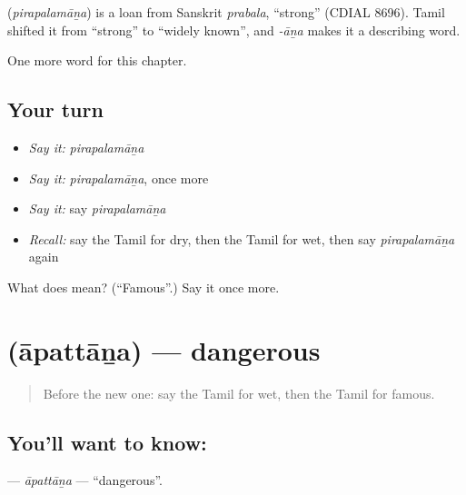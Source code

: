 \begin{cousinweb}
\textbf{} (\emph{pirapalamāṉa}) is a loan from Sanskrit \emph{prabala}, \textquotedblleft{}strong\textquotedblright{} (CDIAL 8696). Tamil shifted it from \textquotedblleft{}strong\textquotedblright{} to \textquotedblleft{}widely known\textquotedblright{}, and \emph{-āṉa} makes it a describing word.
\end{cousinweb}

\begin{grammarlens}[title={What you've built}]
One more word for this chapter.
\end{grammarlens}

\subsection*{Your turn}
\begin{itemize}
\raggedright
  \item \emph{Say it:} \emph{pirapalamāṉa}
  \item \emph{Say it:} \emph{pirapalamāṉa}, once more
  \item \emph{Say it:} say \emph{pirapalamāṉa}
  \item \emph{Recall:} say the Tamil for dry, then the Tamil for wet, then say \emph{pirapalamāṉa} again
\end{itemize}

\begin{tcolorbox}[breakable,colback=teal!4,colframe=teal!35!black,title={Before you move on}]
What does  mean? (\textquotedblleft{}Famous\textquotedblright{}.) Say it once more.
\end{tcolorbox}
\section[\texorpdfstring{\ta{ஆபத்தான} (āpattāṉa)}{ஆபத்தான (āpattāṉa)}]{ (āpattāṉa) — dangerous}

\label{lesson:TA-C149-apattana}



\begin{quote}
Before the new one: say the Tamil for wet, then the Tamil for famous.
\end{quote}

\subsection*{You'll want to know: }
\textbf{} — \emph{āpattāṉa} — \textquotedblleft{}dangerous\textquotedblright{}.

